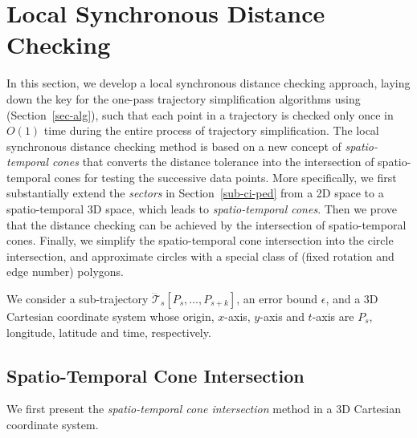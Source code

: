 \section{Local Synchronous Distance Checking}
\label{sec-localcheck}


In this section, we develop a local synchronous distance checking approach, laying down the key for the one-pass trajectory simplification algorithms using \sed (Section~\ref{sec-alg}), such that each point in a trajectory is checked only once in $O(1)$ time during the entire process of trajectory simplification.
The local synchronous distance checking method is based on a new concept of \emph{spatio-temporal cones} that converts the \sed distance tolerance into the intersection of spatio-temporal cones for testing the successive data points.
More specifically, we first substantially extend the \textit{sectors} in Section~\ref{sub-ci-ped} from a 2D space to a spatio-temporal 3D space, which leads to \emph{spatio-temporal cones}. Then we prove that the \sed distance checking can be achieved by the intersection of spatio-temporal cones.
Finally, we simplify the spatio-temporal cone intersection into the circle intersection, and approximate circles with a special class of (fixed rotation and edge number) polygons.


We consider a sub-trajectory $\dddot{\mathcal{T}}_s[P_s, \ldots, P_{s+k}]$, an error bound $\epsilon$, and a 3D Cartesian coordinate system whose origin, $x$-axis, $y$-axis and $t$-axis  are $P_s$, longitude, latitude and time, respectively.

\subsection{Spatio-Temporal Cone Intersection}

We first present the \textit{spatio-temporal cone intersection} method in a 3D Cartesian coordinate system. %





